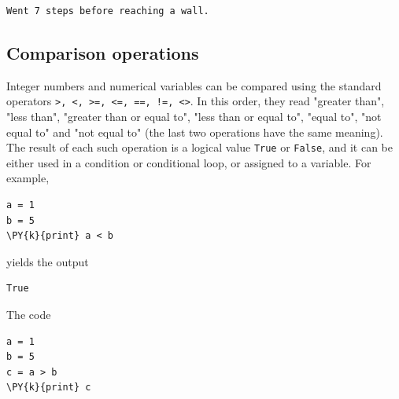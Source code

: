 \begin{ybox}
\begin{verbatim}
Went 7 steps before reaching a wall.
\end{verbatim}
\end{ybox}
\vspace{6mm}

\subsection[\ \ Comparison operations]{Comparison operations}

Integer numbers and numerical variables can be compared using the 
standard operators {\tt >, <, >=, <=, ==, !=, <>}. In this order, 
they read "greater than", "less than", "greater than or equal to", 
"less than or equal to", "equal to", "not equal to" and "not equal to"
(the last two operations have the same meaning). The result of each such 
operation is a logical value {\tt True} or {\tt False}, and it can be 
either used in a condition or conditional loop, or assigned to 
a variable. For example,\\

\begin{bbox}
\begin{Verbatim}[commandchars=\\\{\}]
a = 1
b = 5
\PY{k}{print} a < b
\end{Verbatim}
\end{bbox}
\vspace{6mm}

\noindent
yields the output\\

\begin{ybox}
\begin{Verbatim}[commandchars=\\\{\}]
True
\end{Verbatim}
\end{ybox}
\vspace{6mm}

\noindent
The code\\

\begin{bbox}
\begin{Verbatim}[commandchars=\\\{\}]
a = 1
b = 5
c = a > b
\PY{k}{print} c
\end{Verbatim}
\end{bbox}
\vspace{6mm}

